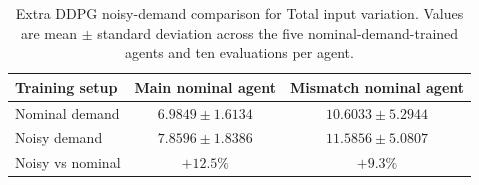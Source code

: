 \begin{table}[htbp]
\centering
\caption{Extra DDPG noisy-demand comparison for Total input variation. Values are mean $\pm$ standard deviation across the five nominal-demand-trained agents and ten evaluations per agent.}
\label{tab:extra_tv_comparison}
\begin{tabular}{lcc}
\toprule
Training setup & Main nominal agent & Mismatch nominal agent \\
\midrule
Nominal demand & $6.9849 \pm 1.6134$ & $10.6033 \pm 5.2944$ \\
Noisy demand & $7.8596 \pm 1.8386$ & $11.5856 \pm 5.0807$ \\
\midrule
Noisy vs nominal & $+12.5\%$ & $+9.3\%$ \\
\bottomrule
\end{tabular}
\end{table}

